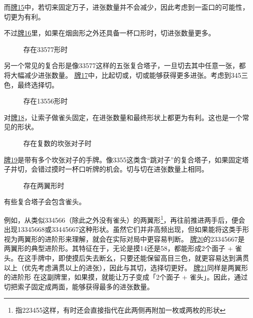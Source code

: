 而\hyperref[lec7:pai14-16]{牌15}中，若切来固定万子，进张数量并不会减少，因此考虑到一盃口的可能性，切更为有利。

不过\hyperref[lec7:pai14-16]{牌16}里，如果在烟囱形之外还具备一杯口形时，切进张数量更多。

\par\bigskip\noindent\ignorespaces
\begin{figure}[h]
    \caption{存在33577形时}
    \label{lec7:pai17}
\end{figure}
另一个常见的复合形是像33577这样的五张复合塔子，一旦切去其中任意一张，都将大幅减少进张数量。
\hyperref[lec7:pai17]{牌17}中，比起切或，切或能够获得更多进张。考虑到345三色，最终选择切。



\begin{figure}[h]
    \caption{存在13556形时}
    \label{lec7:pai18}
\end{figure}
对\hyperref[lec7:pai18]{牌18}，让索子做雀头固定，在进张数量和最终形状上都更为有利。这也是一个常见的形状。

\begin{figure}[h]
    \caption{存在复数的坎张对子时}
    \label{lec7:pai19}
\end{figure}\hyperref[lec7:pai19]{牌19}是带有多个坎张对子的手牌。像3355这类含“跳对子”的复合塔子，如果固定塔子并切，会错过摸时一杯口听牌的机会。切与切在进张数量上相同。

\begin{figure}[h]
    \caption{存在两翼形时}
    \label{lec7:pai20-21}
    \par\bigskip
\end{figure}

有些复合塔子会包含雀头。

例如，从类似334566（除此之外没有雀头）的两翼形\footnote{指223455这样，有时还会直接指代在此两侧再附加一枚或两枚的形状}，再往前推进两手后，便会出现13345668或33445667这种形状。虽然它们并非高频出现，但如果能将这类手形视为两翼形的进阶形来理解，就会在实际对局中更容易判断。
\hyperref[lec7:pai20-21]{牌20}的23345667是两翼形的典型进阶形。其特征在于，无论是摸14还是58，都能形成2个面子 + 雀头。在这手牌中，即使摸后失去断幺，只要还能保留高目三色，就更容易达到满贯以上（优先考虑满贯以上的进张），因此与其切，选择切更好。
\hyperref[lec7:pai20-21]{牌21}同样是两翼形的进阶形
在这副牌里，如果摸，就能让万子变成「2个面子 + 雀头」。因此，通过切把索子固定成两面，能够获得最多的进张数量。


